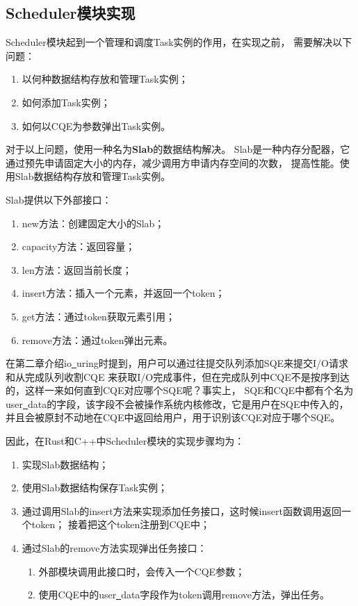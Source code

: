 \documentclass[supercite]{HustGraduPaper}
\theoremstyle{definition}
\begin{document}
\subsection{Scheduler模块实现}

Scheduler模块起到一个管理和调度Task实例的作用，在实现之前，
需要解决以下问题：

\begin{enumerate}[label={(\arabic*)}]
  \item 以何种数据结构存放和管理Task实例；
  \item 如何添加Task实例；
  \item 如何以CQE为参数弹出Task实例。
\end{enumerate}

对于以上问题，使用一种名为\textbf{Slab}的数据结构解决。
Slab是一种内存分配器，它通过预先申请固定大小的内存，减少调用方申请内存空间的次数，
提高性能。使用Slab数据结构存放和管理Task实例。\par

Slab提供以下外部接口：

\begin{enumerate}[label={(\arabic*)}]
  \item new方法：创建固定大小的Slab；
  \item capacity方法：返回容量；
  \item len方法：返回当前长度；
  \item insert方法：插入一个元素，并返回一个token；
  \item get方法：通过token获取元素引用；
  \item remove方法：通过token弹出元素。
\end{enumerate}

在第二章介绍io\underline{~}uring时提到，用户可以通过往提交队列添加SQE来提交I/O请求和从完成队列收割CQE
来获取I/O完成事件，但在完成队列中CQE不是按序到达的，这样一来如何直到CQE对应哪个SQE呢？事实上，
SQE和CQE中都有个名为user\underline{~}data的字段，该字段不会被操作系统内核修改，它是用户在SQE中传入的，
并且会被原封不动地在CQE中返回给用户，用于识别该CQE对应于哪个SQE。\par

因此，在Rust和C++中Scheduler模块的实现步骤均为：

\begin{enumerate}[label={(\arabic*)}]
  \item 实现Slab数据结构；
  \item 使用Slab数据结构保存Task实例；
  \item 通过调用Slab的insert方法来实现添加任务接口，这时候insert函数调用返回一个token；
    接着把这个token注册到CQE中；
  \item 通过Slab的remove方法实现弹出任务接口：
    \begin{enumerate}
      \item 外部模块调用此接口时，会传入一个CQE参数；
      \item 使用CQE中的user\underline{~}data字段作为token调用remove方法，弹出任务。
    \end{enumerate}
\end{enumerate}
\end{document}
